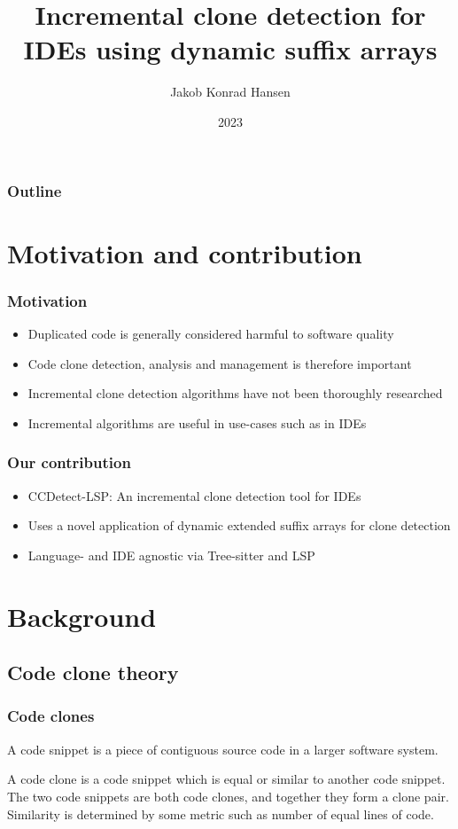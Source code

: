 \documentclass[aspectratio=1610]{beamer}
\title{Incremental clone detection for IDEs using dynamic suffix arrays}
\author{Jakob Konrad Hansen}
\institute{University of Oslo}
\date{2023}
\begin{document}
\frame{\titlepage}

\begin{frame}
    \frametitle{Outline}
    \tableofcontents
\end{frame}

\section{Motivation and contribution}

\begin{frame}
\frametitle{Motivation}
\begin{itemize}
    \item Duplicated code is generally considered harmful to software quality
    \item Code clone detection, analysis and management is therefore important
    \item Incremental clone detection algorithms have not been thoroughly researched
    \item Incremental algorithms are useful in use-cases such as in IDEs
\end{itemize}
\end{frame}

\begin{frame}
\frametitle{Our contribution}
\begin{itemize}
    \item CCDetect-LSP: An incremental clone detection tool for IDEs
    \item Uses a novel application of dynamic extended suffix arrays for clone detection
    \item Language- and IDE agnostic via Tree-sitter and LSP
\end{itemize}
\end{frame}

\section{Background}

\subsection{Code clone theory}

\begin{frame}
    \frametitle{Code clones}

    \begin{definition}
        A code snippet is a piece of contiguous source code in a larger software system.
    \end{definition}

    \begin{definition}
        A code clone is a code snippet which is equal or similar to another code snippet. The two
        code snippets are both code clones, and together they form a clone pair.
        Similarity is determined by some metric such as number of equal lines of code.
    \end{definition}
\end{frame}
\end{document}
